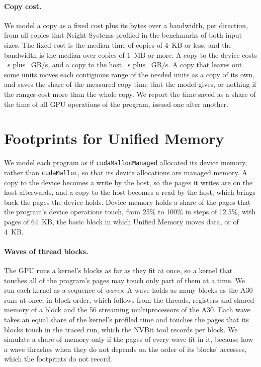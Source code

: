 \documentclass[11pt]{article}
\newcommand{\term}[1]{\emph{#1}}
\newcommand{\code}[1]{\texttt{#1}}
\begin{document}
\paragraph{Copy cost.} We model a copy as a fixed cost plus its bytes over a bandwidth, per direction, from all
copies that Nsight Systems profiled in the benchmarks of both input sizes. The fixed cost is the median time of
copies of 4~KB or less, and the bandwidth is the median over copies of 1~MB or more. A copy to the device costs
\numCopyHtoDFixedUs{}~\textmu s plus \numCopyHtoDGBs{}~GB/s, and a copy to the host \numCopyDtoHFixedUs{}~\textmu s plus
\numCopyDtoHGBs{}~GB/s. A copy that leaves out some units moves each contiguous range of the needed units as a copy
of its own, and saves the share of the measured copy time that the model gives, or nothing if the ranges cost
more than the whole copy. We report the time saved as a share of the time of all GPU operations of the program,
issued one after another.

\section{Footprints for Unified Memory}
\label{sec:uvm}

\begin{sloppypar}
We model each program as if \code{cudaMallocManaged} allocated its device memory, rather than
\code{cudaMalloc}, so that its device allocations are managed memory. A copy to the device becomes a write by the
host, so the pages it writes are on the host afterwards, and a copy to the host becomes a read by the host, which
brings back the pages the device holds. Device memory holds a share of the pages that the program's device
operations touch, from 25\% to 100\% in steps of 12.5\%, with pages of 64~KB, the basic block in which Unified
Memory moves data, or of 4~KB.
\end{sloppypar}

\paragraph{Waves of thread blocks.} The GPU runs a kernel's blocks as far as they fit at once, so a kernel that
touches all of the program's pages may touch only part of them at a time. We run each kernel as a sequence of
\term{waves}. A wave holds as many blocks as the A30 runs at once, in block order, which follows from the threads,
registers and shared memory of a block and the 56 streaming multiprocessors of the A30. Each wave takes an equal share
of the kernel's profiled time and touches the pages that its blocks touch in the traced run, which the NVBit tool
records per block. We simulate a share of memory only if the pages of every wave fit in it, because how a wave
thrashes when they do not depends on the order of its blocks' accesses, which the footprints do not record.
\end{document}
